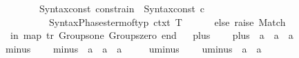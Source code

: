 \begin{isabellebody}
\ \ \ \ \ \ \ \ Syntax{\isachardot}{\kern0pt}const\ \isactrlsyntaxUNDERSCOREconst {\isasymopen}{\isacharunderscore}{\kern0pt}constrain{\isasymclose}\ {\isachardollar}{\kern0pt}\ Syntax{\isachardot}{\kern0pt}const\ c\ {\isachardollar}{\kern0pt}\isanewline
\ \ \ \ \ \ \ \ \ \ Syntax{\isacharunderscore}{\kern0pt}Phases{\isachardot}{\kern0pt}term{\isacharunderscore}{\kern0pt}of{\isacharunderscore}{\kern0pt}typ\ ctxt\ T\isanewline
\ \ \ \ \ \ else\ raise\ Match{\isacharparenright}{\kern0pt}{\isacharsemicolon}{\kern0pt}\isanewline
\ \ in\ map\ tr{\isacharprime}{\kern0pt}\ {\isacharbrackleft}{\kern0pt}\isactrlconstUNDERSCOREsyntax {\isasymopen}Groups{\isachardot}{\kern0pt}one{\isasymclose}{\isacharcomma}{\kern0pt}\ \isactrlconstUNDERSCOREsyntax {\isasymopen}Groups{\isachardot}{\kern0pt}zero{\isasymclose}{\isacharbrackright}{\kern0pt}\ end\isanewline
{\isacartoucheclose}\ %
%
\endisatagML
{\isafoldML}%
%
\isadelimML
\isanewline
%
\endisadelimML
\isanewline
{}\isamarkupfalse%
\ plus\ {\isacharequal}{\kern0pt}\isanewline
\ \ \ plus\ {\isacharcolon}{\kern0pt}{\isacharcolon}{\kern0pt}\ {\isachardoublequoteopen}{\isacharprime}{\kern0pt}a\ {\isasymRightarrow}\ {\isacharprime}{\kern0pt}a\ {\isasymRightarrow}\ {\isacharprime}{\kern0pt}a{\isachardoublequoteclose}\ \ {\isacharparenleft}{\kern0pt}\ {\isachardoublequoteopen}{\isacharplus}{\kern0pt}{\isachardoublequoteclose}\ {}{}{\isacharparenright}{\kern0pt}\isanewline
\isanewline
{}\isamarkupfalse%
\ minus\ {\isacharequal}{\kern0pt}\isanewline
\ \ \ minus\ {\isacharcolon}{\kern0pt}{\isacharcolon}{\kern0pt}\ {\isachardoublequoteopen}{\isacharprime}{\kern0pt}a\ {\isasymRightarrow}\ {\isacharprime}{\kern0pt}a\ {\isasymRightarrow}\ {\isacharprime}{\kern0pt}a{\isachardoublequoteclose}\ \ {\isacharparenleft}{\kern0pt}\ {\isachardoublequoteopen}{\isacharminus}{\kern0pt}{\isachardoublequoteclose}\ {}{}{\isacharparenright}{\kern0pt}\isanewline
\isanewline
{}\isamarkupfalse%
\ uminus\ {\isacharequal}{\kern0pt}\isanewline
\ \ \ uminus\ {\isacharcolon}{\kern0pt}{\isacharcolon}{\kern0pt}\ {\isachardoublequoteopen}{\isacharprime}{\kern0pt}a\ {\isasymRightarrow}\ {\isacharprime}{\kern0pt}a{\isachardoublequoteclose}\ \ {\isacharparenleft}{\kern0pt}{\isachardoublequoteopen}{\isacharminus}{\kern0pt}\ {\isacharunderscore}{\kern0pt}{\isachardoublequoteclose}\ {\isacharbrackleft}{\kern0pt}{}{}{\isacharbrackright}{\kern0pt}\ {}{}{\isacharparenright}{\kern0pt}\isanewline

\end{isabellebody}
